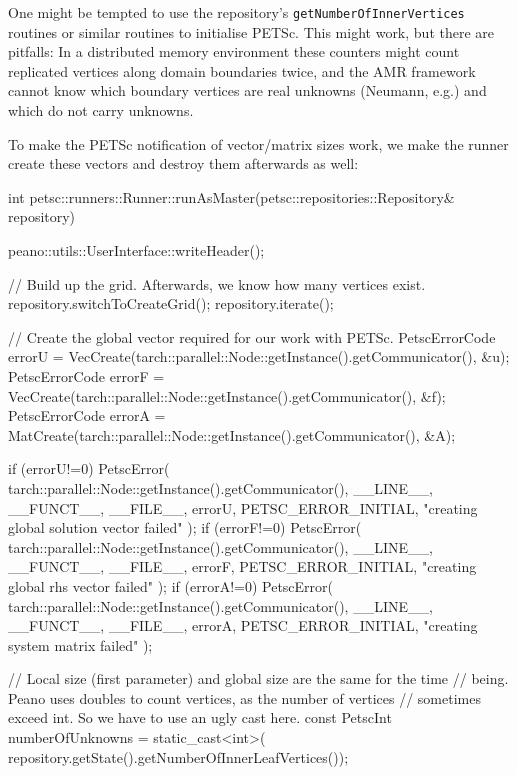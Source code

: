 \begin{remark}
 One might be tempted to use the repository's \texttt{getNumberOfInnerVertices}
 routines or similar routines to initialise PETSc.
 This might work, but there are pitfalls: In a distributed memory environment
 these counters might count replicated vertices along domain boundaries twice,
 and the AMR framework cannot know which boundary vertices are real unknowns
 (Neumann, e.g.) and which do not carry unknowns.
\end{remark}



To make the PETSc notification of vector/matrix sizes work, we make the runner
create these vectors and destroy them afterwards as well:

\begin{code}
int petsc::runners::Runner::runAsMaster(petsc::repositories::Repository& repository) {
  peano::utils::UserInterface::writeHeader();

  // Build up the grid. Afterwards, we know how many vertices exist.
  repository.switchToCreateGrid(); repository.iterate();

  // Create the global vector required for our work with PETSc.
  PetscErrorCode errorU   = 
    VecCreate(tarch::parallel::Node::getInstance().getCommunicator(), &u);
  PetscErrorCode errorF = 
    VecCreate(tarch::parallel::Node::getInstance().getCommunicator(), &f);
  PetscErrorCode errorA   = 
    MatCreate(tarch::parallel::Node::getInstance().getCommunicator(), &A);

  if (errorU!=0) {
    PetscError( tarch::parallel::Node::getInstance().getCommunicator(),
      __LINE__,  __FUNCT__,  __FILE__, errorU,  PETSC_ERROR_INITIAL,
      "creating global solution vector failed" );
  }
  if (errorF!=0) {
    PetscError( tarch::parallel::Node::getInstance().getCommunicator(),
      __LINE__,  __FUNCT__,  __FILE__, errorF,  PETSC_ERROR_INITIAL,
      "creating global rhs vector failed" );
  }
  if (errorA!=0) {
    PetscError( tarch::parallel::Node::getInstance().getCommunicator(),
      __LINE__,  __FUNCT__,  __FILE__, errorA,  PETSC_ERROR_INITIAL,
      "creating system matrix failed" );
  }


  // Local size (first parameter) and global size are the same for the time
  // being. Peano uses doubles to count vertices, as the number of vertices
  // sometimes exceed int. So we have to use an ugly cast here.
  const PetscInt numberOfUnknowns = static_cast<int>(
    repository.getState().getNumberOfInnerLeafVertices());

}
\end{code}
